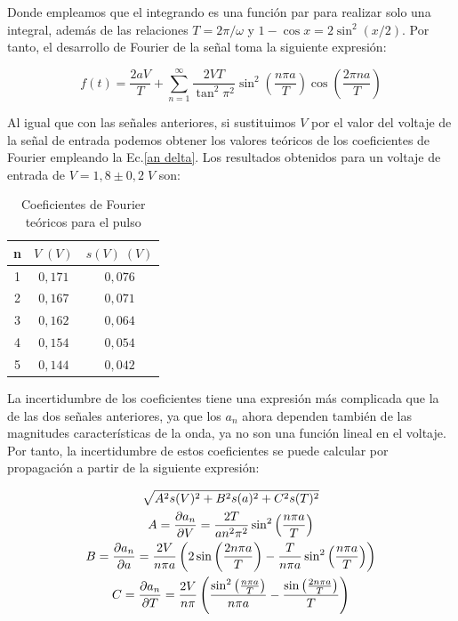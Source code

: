 \documentclass[a4paper,12pt,titlepage]{article}
\begin{document}
Donde empleamos que el integrando es una función par para realizar solo una integral, además de las relaciones $T=2\pi/\omega$ y $1-\cos x = 2\sin^2 (x/2)$. Por tanto, el desarrollo de Fourier de la señal toma la siguiente expresión:

\begin{equation}
    f(t) = \frac{2aV}{T} + \sum_{n=1}^{\infty} \frac{2VT}{\tan^2\pi^2} \sin^2 \left(\frac{n\pi a}{T}\right) \cos \left(\frac{2\pi n a}{T} \right)
\end{equation}

Al igual que con las señales anteriores, si sustituimos $V$ por el valor del voltaje de la señal de entrada podemos obtener los valores teóricos de los coeficientes de Fourier empleando la Ec.\ref{an delta}. Los resultados obtenidos para un voltaje de entrada de $V=1,8 \pm 0,2 \;V$ son:

\newpage

\begin{table}[h!]
\centering
\begin{tabular}{|c|c|c|}
\hline
n & $V\;(V)$ & $s(V)\;(V)$ \\ \hline
1 & $0,171$ & $0,076$ \\ \hline
2 & $0,167$ & $0,071$ \\ \hline
3 & $0,162$ & $0,064$ \\ \hline
4 & $0,154$ & $0,054$ \\ \hline
5 & $0,144$ & $0,042$ \\ \hline
\end{tabular}
\caption{Coeficientes de Fourier teóricos para el pulso}
\label{tab:my-table}
\end{table}

La incertidumbre de los coeficientes tiene una expresión más complicada que la de las dos señales anteriores, ya que los $a_n$ ahora dependen también de las magnitudes características de la onda, ya no son una función lineal en el voltaje. Por tanto, la incertidumbre de estos coeficientes se puede calcular por propagación a partir de la siguiente expresión:

\begin{equation}
    \begin{gathered}
        \sqrt{A^2 s(V)^2 + B^2 s(a)^2 + C^2 s(T)^2} \\
        A = \pdv{a_n}{V} = \frac{2T}{an^2\pi^2} \sin^2 \left(\frac{n\pi a}{T} \right) \\
        B = \pdv{a_n}{a} = \frac{2V}{n \pi a} \left( 2 \sin \left(\frac{2n\pi a}{T} \right) - \frac{T}{n \pi a} \sin^2 \left( \frac{n\pi a}{T} \right) \right) \\
        C = \pdv{a_n}{T} = \frac{2V}{n\pi} \left( \frac{\sin^2 \left(\frac{n\pi a}{T}\right)}{n\pi a} - \frac{\sin \left(\frac{2n\pi a}{T}\right)}{T} \right)
    \end{gathered}
\end{equation}
\end{document}
